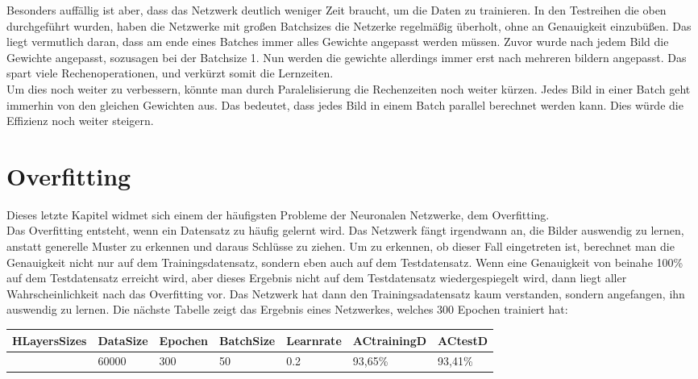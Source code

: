 \documentclass[12pt]{article}
\begin{document}
Besonders auffällig ist aber, dass das Netzwerk deutlich weniger Zeit braucht, um die Daten zu trainieren. In den Testreihen die oben durchgeführt wurden, haben die Netzwerke mit großen Batchsizes die Netzerke regelmäßig überholt, ohne an Genauigkeit einzubüßen.
Das liegt vermutlich daran, dass am ende eines Batches immer alles Gewichte angepasst werden müssen. Zuvor wurde nach jedem Bild die Gewichte angepasst, sozusagen bei der Batchsize 1. Nun werden die gewichte allerdings immer erst nach mehreren bildern angepasst. Das spart viele Rechenoperationen, und verkürzt somit die Lernzeiten. \\
Um dies noch weiter zu verbessern, könnte man durch Paralelisierung die Rechenzeiten noch weiter kürzen. Jedes Bild in einer Batch geht immerhin von den gleichen Gewichten aus. Das bedeutet, dass jedes Bild in einem Batch parallel berechnet werden kann. Dies würde die Effizienz noch weiter steigern.

\section{Overfitting}
Dieses letzte Kapitel widmet sich einem der häufigsten Probleme der Neuronalen Netzwerke, dem Overfitting. \\
Das Overfitting entsteht, wenn ein Datensatz zu häufig gelernt wird. Das Netzwerk fängt irgendwann an, die Bilder auswendig zu lernen, anstatt generelle Muster zu erkennen und daraus Schlüsse zu ziehen. 
Um zu erkennen, ob dieser Fall eingetreten ist, berechnet man die Genauigkeit nicht nur auf dem Trainingsdatensatz, sondern eben auch auf dem Testdatensatz. Wenn eine Genauigkeit von beinahe 100\% auf dem Testdatensatz erreicht wird, aber dieses Ergebnis nicht auf dem Testdatensatz wiedergespiegelt wird, dann liegt aller Wahrscheinlichkeit nach das Overfitting vor. Das Netzwerk hat dann den Trainingsadatensatz kaum verstanden, sondern angefangen, ihn auswendig zu lernen.
Die nächste Tabelle zeigt das Ergebnis eines Netzwerkes, welches 300 Epochen trainiert hat:

\begin{table}[H]
    \centering
    \begin{tabular}{|l|l|l|l|l|l|l|}
    \hline
        HLayersSizes & DataSize & Epochen & BatchSize & Learnrate & ACtrainingD & ACtestD \\ \hline
        [784, 80, 10] & 60000 & 300 & 50 & 0.2 & 93,65\% & 93,41\% \\ \hline
    \end{tabular}
\end{table}
\end{document}
